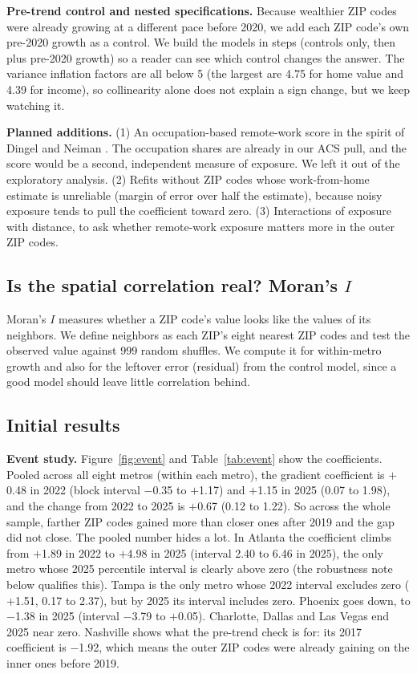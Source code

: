 \documentclass[11pt]{article}
\begin{document}
\textbf{Pre-trend control and nested specifications.} Because wealthier ZIP codes were already growing at a different pace before
2020, we add each ZIP code's own pre-2020 growth as a control. We build the models in steps (controls only, then plus
pre-2020 growth) so a reader can see which control changes the answer. The variance inflation factors are all below 5 (the
largest are 4.75 for home value and 4.39 for income), so collinearity alone does not explain a sign change, but we keep
watching it.

\textbf{Planned additions.} (1) An occupation-based remote-work score in the spirit of Dingel and Neiman \cite{dingel}. The
occupation shares are already in our ACS pull, and the score would be a second, independent measure of exposure. We left it
out of the exploratory analysis. (2) Refits without ZIP codes whose work-from-home estimate is unreliable
(margin of error over half the estimate), because noisy exposure tends to pull the coefficient toward zero. (3) Interactions of
exposure with distance, to ask whether remote-work exposure matters more in the outer ZIP codes.

\subsection{Is the spatial correlation real? Moran's $I$}
\label{sec:moran}

Moran's $I$ \cite{moran} measures whether a ZIP code's value looks like the values of its neighbors. We define neighbors as each
ZIP's eight nearest ZIP codes and test the observed value against 999 random shuffles. We compute it for within-metro growth and
also for the leftover error (residual) from the control model, since a good model should leave little correlation behind.

\subsection{Initial results}

\textbf{Event study.} Figure~\ref{fig:event} and Table~\ref{tab:event} show the coefficients. Pooled across all eight metros
(within each metro), the gradient coefficient is $+$0.48 in 2022 (block interval $-$0.35 to $+$1.17) and $+$1.15 in 2025
(0.07 to 1.98), and the change from 2022 to 2025 is $+$0.67 (0.12 to 1.22). So across the whole sample, farther ZIP codes
gained more than closer ones after 2019 and the gap did not close. The pooled number hides a lot. In Atlanta the coefficient climbs
from $+$1.89 in 2022 to $+$4.98 in 2025 (interval 2.40 to 6.46 in 2025), the only metro whose 2025 percentile interval is clearly above
zero (the robustness note below qualifies this). Tampa is the only metro whose 2022 interval excludes zero ($+$1.51, 0.17 to 2.37), but by 2025 its interval includes zero.
Phoenix goes down, to $-$1.38 in 2025 (interval $-$3.79 to $+$0.05). Charlotte, Dallas and Las Vegas end 2025 near zero.
Nashville shows what the pre-trend check is for: its 2017 coefficient is $-$1.92, which means the outer ZIP codes were
already gaining on the inner ones before 2019.
\end{document}

